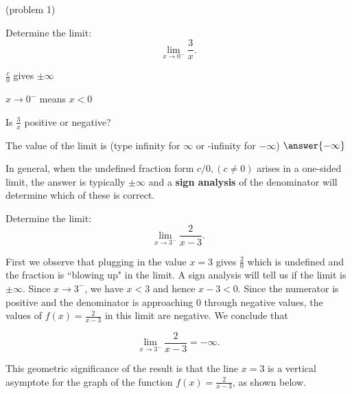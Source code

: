 \documentclass[handout]{ximera}
\begin{document}
\begin{problem}(problem 1)
  
	Determine the limit:
  \[
  \lim_{x \to 0^-} \frac{3}{x}.
  \]
		
		\begin{hint}
      $\frac{c}{0}$ gives $\pm \infty$
    \end{hint}
    \begin{hint}
      $x \to 0^-$ means $x<0$
    \end{hint}
    \begin{hint}
      Is $\frac{3}{x}$ positive or negative?
    \end{hint}
    
		The value of the limit  is
		(type infinity for $\infty$ or -infinity for $-\infty$)
		 $\answer{-\infty}$
		
\end{problem}
In general, when the undefined fraction form $c/0, (c\neq 0)$
arises in a one-sided limit, the answer is typically $\pm \infty$ and
a \textbf{sign analysis} of the denominator will determine which of these is correct.

\begin{example}[example 2]
Determine the limit: 
\[
\lim_{x \to 3^-} \frac{2}{x-3}.
\] 


First we observe that plugging in the value $x=3$ gives $\frac{2}{0}$ which is undefined and 
the fraction is ``blowing up" in the limit.  A sign analysis will tell us if the limit is $\pm\infty$.
Since $x \to 3^-$, we have $x<3$ and hence $x-3 <0$. 
Since the numerator is positive and the denominator is approaching $0$ through negative values,
the values of $f(x) = \frac{2}{x-3}$ in this limit are negative.  We conclude that

\[
\lim_{x \to 3^-} \frac{2}{x-3} =  -\infty. 
\]

This geometric significance of the result is that the line $x=3$ is a vertical asymptote for the 
graph of the function $f(x) = \frac{2}{x-3}$, as shown below.




\begin{center}
\end{center}
\end{example}
\end{document}
